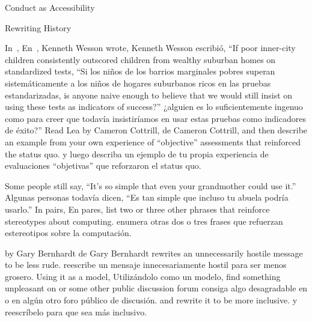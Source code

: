 \begin{aside}{Conduct as Accessibility}
\begin{aside}{Rewriting History}

In~\cite{Litt2004},
En~\cite{Litt2004},
Kenneth Wesson wrote,
Kenneth Wesson escribió,
``If poor inner-city children consistently outscored children from wealthy suburban homes on standardized tests,
``Si los niños de los barrios marginales pobres superan sistemáticamente a los niños de hogares suburbanos ricos en las pruebas estandarizadas,
is anyone naive enough to believe that we would still insist on using these tests as indicators of success?''
¿alguien es lo suficientemente ingenuo como para creer que todavía insistiríamos en usar estas pruebas como indicadores de éxito?''
Read 
Lea 
by Cameron Cottrill,
de Cameron Cottrill,
and then describe an example from your own experience of ``objective'' assessments that reinforced the status quo.
y luego describa un ejemplo de tu propia experiencia de evaluaciones ``objetivas'' que reforzaron el status quo.


Some people still say, ``It's so simple that even your grandmother could use it.''
Algunas personas todavía dicen, ``Es tan simple que incluso tu abuela podría usarlo.''
In pairs,
En pares,
list two or three other phrases that reinforce stereotypes about computing.
enumera otras dos o tres frases que refuerzan estereotipos sobre la computación.



by Gary Bernhardt
de Gary Bernhardt
rewrites an unnecessarily hostile message to be less rude.
reescribe un mensaje innecesariamente hostil para ser menos grosero.
Using it as a model,
Utilizándolo como un modelo,
find something unpleasant on  or some other public discussion forum
consiga algo desagradable en  o en algún otro foro público de discusión.
and rewrite it to be more inclusive.
y reescríbelo para que sea más inclusivo.


\end{aside}
\end{aside}
